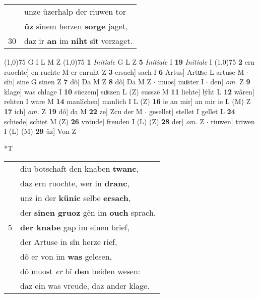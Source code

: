 \documentclass[8pt,a4paper,notitlepage]{article}
\begin{document}
\begin{table}[ht]
\begin{minipage}[t]{0.5\linewidth}
\begin{tabular}{rl}
 & unze ûzerhalp der riuwen tor\\ 
 & \textbf{ûz} sînem herzen \textbf{sorge} jaget,\\ 
30 & daz ir \textbf{an} im \textbf{niht} sît verzaget.\\ 
\end{tabular}
\scriptsize
\line(1,0){75} \newline
G I L M Z \newline
\line(1,0){75} \newline
\textbf{1} \textit{Initiale} G L Z  \textbf{5} \textit{Initiale} I  \textbf{19} \textit{Initiale} I  \newline
\line(1,0){75} \newline
\textbf{2} ern ruochte] en ruchte M er enruht Z \textbf{3} ersach] sach I \textbf{6} Artus] Artuͯse L artuse M  $\cdot$ sîn] sine G sinen Z \textbf{7} dô] Da M Z \textbf{8} dô] Da M Z  $\cdot$ muos] muͤster I  $\cdot$ den] \textit{om.} Z \textbf{9} klage] was chlage I \textbf{10} süezem] suͯszen L (Z) susszē M \textbf{11} liehte] lýht L \textbf{12} wâren] rehten I ware M \textbf{14} manlîchen] manlich I L (Z) \textbf{16} ie an mir] an mir ie L (M) Z \textbf{17} ich] \textit{om.} Z \textbf{19} dô] da M \textbf{22} ze] Zcu der M  $\cdot$ gesellet] stellet I gellet L \textbf{24} schiede] schiet M (Z) \textbf{26} vröude] freuden I (L) (Z) \textbf{28} der] \textit{om.} Z  $\cdot$ riuwen] triwen I (L) (M) \textbf{29} ûz] Von Z \newline
\end{minipage}
\hspace{0.5cm}
\begin{minipage}[t]{0.5\linewidth}
\small
\begin{center}*T
\end{center}
\begin{tabular}{rl}
 & diu botschaft den knaben \textbf{twanc},\\ 
 & daz ern ruochte, wer in \textbf{dranc},\\ 
 & unz in der \textbf{künic} selbe \textbf{ersach},\\ 
 & der \textbf{sînen gruoz} gên im \textbf{ouch} sprach.\\ 
5 & \textbf{der knabe} gap im einen brief,\\ 
 & der Artuse in sîn herze rief,\\ 
 & dô er von im \textbf{was} gelesen,\\ 
 & dô muost \textit{er} bî \textbf{den} beiden wesen:\\ 
 & daz ein was vreude, daz ander klage.\\ 

\end{tabular}
\end{minipage}
\end{table}
\end{document}
